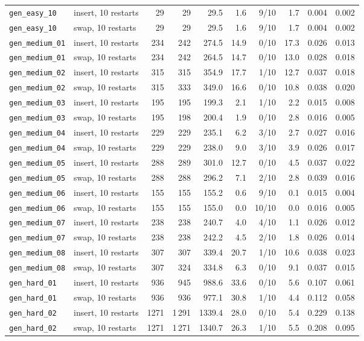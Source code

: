 \begin{tabular}{llrrrrrrrr}
\texttt{gen\_easy\_10} & insert, 10 restarts & 29 & 29 & 29.5 & 1.6 & 9/10 & 1.7 & 0.004 & 0.002 \\
\texttt{gen\_easy\_10} & swap, 10 restarts & 29 & 29 & 29.5 & 1.6 & 9/10 & 1.7 & 0.004 & 0.002 \\
\texttt{gen\_medium\_01} & insert, 10 restarts & 234 & 242 & 274.5 & 14.9 & 0/10 & 17.3 & 0.026 & 0.013 \\
\texttt{gen\_medium\_01} & swap, 10 restarts & 234 & 242 & 264.5 & 14.7 & 0/10 & 13.0 & 0.028 & 0.018 \\
\texttt{gen\_medium\_02} & insert, 10 restarts & 315 & 315 & 354.9 & 17.7 & 1/10 & 12.7 & 0.037 & 0.018 \\
\texttt{gen\_medium\_02} & swap, 10 restarts & 315 & 333 & 349.0 & 16.6 & 0/10 & 10.8 & 0.038 & 0.020 \\
\texttt{gen\_medium\_03} & insert, 10 restarts & 195 & 195 & 199.3 & 2.1 & 1/10 & 2.2 & 0.015 & 0.008 \\
\texttt{gen\_medium\_03} & swap, 10 restarts & 195 & 198 & 200.4 & 1.9 & 0/10 & 2.8 & 0.016 & 0.005 \\
\texttt{gen\_medium\_04} & insert, 10 restarts & 229 & 229 & 235.1 & 6.2 & 3/10 & 2.7 & 0.027 & 0.016 \\
\texttt{gen\_medium\_04} & swap, 10 restarts & 229 & 229 & 238.0 & 9.0 & 3/10 & 3.9 & 0.026 & 0.017 \\
\texttt{gen\_medium\_05} & insert, 10 restarts & 288 & 289 & 301.0 & 12.7 & 0/10 & 4.5 & 0.037 & 0.022 \\
\texttt{gen\_medium\_05} & swap, 10 restarts & 288 & 288 & 296.2 & 7.1 & 2/10 & 2.8 & 0.039 & 0.016 \\
\texttt{gen\_medium\_06} & insert, 10 restarts & 155 & 155 & 155.2 & 0.6 & 9/10 & 0.1 & 0.015 & 0.004 \\
\texttt{gen\_medium\_06} & swap, 10 restarts & 155 & 155 & 155.0 & 0.0 & 10/10 & 0.0 & 0.016 & 0.005 \\
\texttt{gen\_medium\_07} & insert, 10 restarts & 238 & 238 & 240.7 & 4.0 & 4/10 & 1.1 & 0.026 & 0.012 \\
\texttt{gen\_medium\_07} & swap, 10 restarts & 238 & 238 & 242.2 & 4.5 & 2/10 & 1.8 & 0.026 & 0.014 \\
\texttt{gen\_medium\_08} & insert, 10 restarts & 307 & 307 & 339.4 & 20.7 & 1/10 & 10.6 & 0.038 & 0.023 \\
\texttt{gen\_medium\_08} & swap, 10 restarts & 307 & 324 & 334.8 & 6.3 & 0/10 & 9.1 & 0.037 & 0.015 \\
\texttt{gen\_hard\_01} & insert, 10 restarts & 936 & 945 & 988.6 & 33.6 & 0/10 & 5.6 & 0.107 & 0.061 \\
\texttt{gen\_hard\_01} & swap, 10 restarts & 936 & 936 & 977.1 & 30.8 & 1/10 & 4.4 & 0.112 & 0.058 \\
\texttt{gen\_hard\_02} & insert, 10 restarts & 1271 & 1\,291 & 1339.4 & 28.0 & 0/10 & 5.4 & 0.229 & 0.138 \\
\texttt{gen\_hard\_02} & swap, 10 restarts & 1271 & 1\,271 & 1340.7 & 26.3 & 1/10 & 5.5 & 0.208 & 0.095 \\
\bottomrule
\end{tabular}
